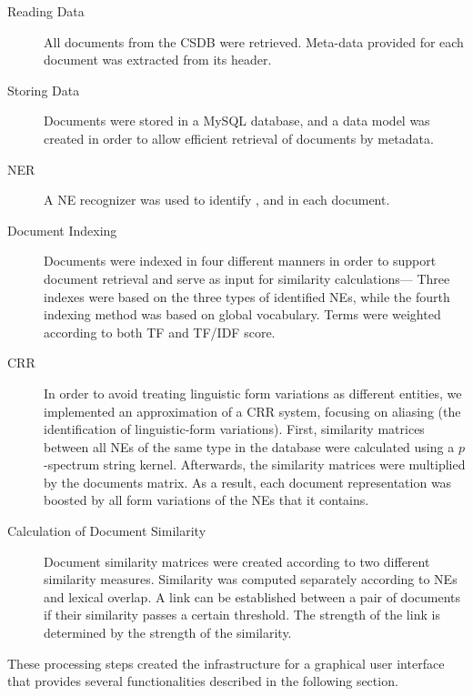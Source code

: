 \begin{description}
\item[Reading Data] All documents from the CSDB were retrieved. Meta-data provided for each document was extracted from its header.
\item[Storing Data] Documents were stored in a MySQL database, and a data model was created in order to allow efficient retrieval of documents by metadata.
\item[NER] A NE recognizer was used to identify ,  and  in each document.
\item[Document Indexing] Documents were indexed in four different manners in order to support document retrieval and serve as input for similarity calculations--- Three indexes were based on the three types of identified NEs, while the fourth indexing method was based on global vocabulary. Terms were weighted according to both TF and TF/IDF score.
\item[CRR] In order to avoid treating linguistic form variations as different entities, we implemented an approximation of a CRR system, focusing on aliasing (the identification of linguistic-form variations).
First, similarity matrices between all NEs of the same type in the database were calculated using a $p$-spectrum string kernel.
Afterwards, the similarity matrices were multiplied by the documents matrix. As a result, each document representation was boosted by all form 
variations of the NEs that it contains.
\item[Calculation of Document Similarity] Document similarity matrices were created according to two different similarity measures. 
Similarity was computed separately according to NEs and lexical overlap. 
A link can be established between a pair of documents if their similarity passes a certain threshold. 
The strength of the link is determined by the strength of the similarity.
\end{description}

These processing steps created the infrastructure for a graphical user interface that provides several
functionalities described in the following section.


